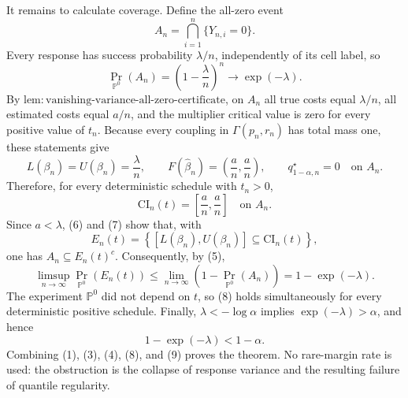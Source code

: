 It remains to calculate coverage.  Define the all-zero event
\[
A_n=\bigcap_{i=1}^{n}\lbrace Y_{n,i}=0\rbrace.
\]
Every response has success probability \(\lambda/n\), independently of its cell label, so
\[
\Pr_{\mathbb P^0}(A_n)
=\left(1-\frac{\lambda}{n}\right)^n
\longrightarrow\exp(-\lambda).
\tag{5}
\]
By \(\mathrm{lem:vanishing\text{-}variance\text{-}all\text{-}zero\text{-}certificate}\), on \(A_n\) all true costs equal \(\lambda/n\), all estimated costs equal \(a/n\), and the multiplier critical value is zero for every positive value of \(t_n\).  Because every coupling in \(\Gamma(p_n,r_n)\) has total mass one, these statements give
\[
L(\beta_n)=U(\beta_n)=\frac{\lambda}{n},
\qquad
F(\widehat\beta_n)=\left(\frac{a}{n},\frac{a}{n}\right),
\qquad
q_{1-\alpha,n}^\star=0
\quad\text{on }A_n.
\tag{6}
\]
Therefore, for every deterministic schedule with \(t_n>0\),
\[
\mathrm{CI}_n(t)=\left[\frac{a}{n},\frac{a}{n}\right]
\quad\text{on }A_n.
\tag{7}
\]
Since \(a<\lambda\), (6) and (7) show that, with
\[
E_n(t)=\left\lbrace[L(\beta_n),U(\beta_n)]
\subseteq\mathrm{CI}_n(t)\right\rbrace,
\]
one has \(A_n\subseteq E_n(t)^c\).  Consequently, by (5),
\[
\limsup_{n\to\infty}\Pr_{\mathbb P^0}(E_n(t))
\leq
\lim_{n\to\infty}\left(1-\Pr_{\mathbb P^0}(A_n)\right)
=1-\exp(-\lambda).
\tag{8}
\]
The experiment \(\mathbb P^0\) did not depend on \(t\), so (8) holds simultaneously for every deterministic positive schedule.  Finally, \(\lambda<-\log\alpha\) implies \(\exp(-\lambda)>\alpha\), and hence
\[
1-\exp(-\lambda)<1-\alpha.
\tag{9}
\]
Combining (1), (3), (4), (8), and (9) proves the theorem.  No rare-margin rate is used: the obstruction is the collapse of response variance and the resulting failure of quantile regularity.

